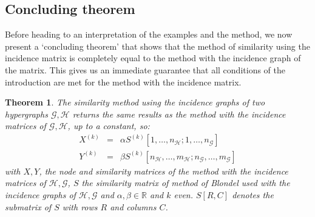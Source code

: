\documentclass[a4paper,11pt]{report}
\newtheorem{theorem}{Theorem}[section]
\newcommand{\R}{{\mathbb R}}
\newcommand{\hgraf}{\mathcal{G}}
\newcommand{\hgrafeen}{\mathcal{H}}
\begin{document}
 \subsection{Concluding theorem}
 Before heading to an interpretation of the examples and the method, we now 
 present a `concluding theorem' that shows that the method of similarity using 
 the incidence matrix is completely equal to the method with the incidence graph 
 of the matrix. This gives us an immediate guarantee that all conditions of the 
 introduction are met for the method with the incidence matrix.
\begin{theorem}\label{concludingtheorem}
  The similarity method using the incidence graphs of two hypergraphs $\hgraf, \hgrafeen$ returns the same results as the method with the 
  incidence matrices of $\hgraf, \hgrafeen$, up to a constant, so:
\begin{eqnarray*}
  X^{(k)} &=& \alpha S^{(k)}[1,\ldots,n_\hgrafeen;1,\ldots,n_\hgraf]\\
  Y^{(k)} &=& \beta S^{(k)}[n_\hgrafeen,\ldots, m_\hgrafeen;n_\hgraf,\ldots, m_\hgraf]
\end{eqnarray*}
with $X, Y$, the node and similarity matrices of the method with the incidence matrices of $\hgrafeen, \hgraf$, $S$ the 
similarity matrix of method of Blondel used with the incidence graphs of $\hgrafeen, \hgraf$ 
and $\alpha, \beta \in \R$ and $k$ even. $S[R,C]$ denotes the submatrix of $S$ with rows $R$
 and columns $C$. \end{theorem}
\end{document}
